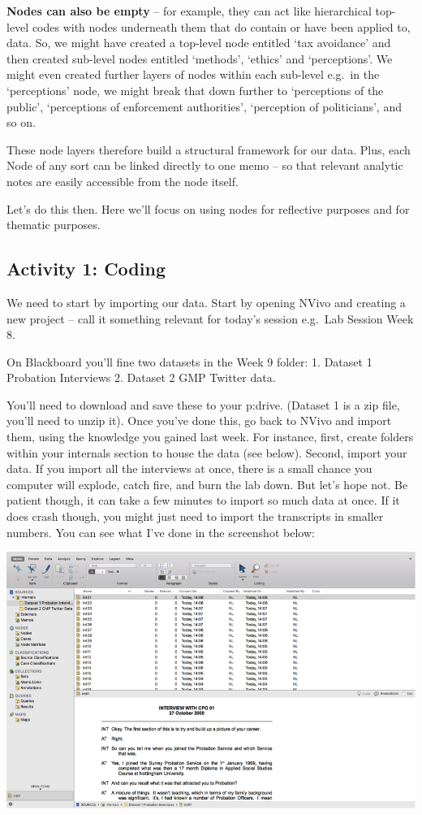 \documentclass[]{book}
\theoremstyle{definition}
\theoremstyle{definition}
\theoremstyle{definition}
\theoremstyle{remark}
\begin{document}
\textbf{Nodes can also be empty} -- for example, they can act like
hierarchical top-level codes with nodes underneath them that do contain
or have been applied to, data. So, we might have created a top-level
node entitled `tax avoidance' and then created sub-level nodes entitled
`methods', `ethics' and `perceptions'. We might even created further
layers of nodes within each sub-level e.g.~in the `perceptions' node, we
might break that down further to `perceptions of the public',
`perceptions of enforcement authorities', `perception of politicians',
and so on.

These node layers therefore build a structural framework for our data.
Plus, each Node of any sort can be linked directly to one memo -- so
that relevant analytic notes are easily accessible from the node itself.

Let's do this then. Here we'll focus on using nodes for reflective
purposes and for thematic purposes.

\hypertarget{activity-1-coding}{%
\subsection{Activity 1: Coding}\label{activity-1-coding}}

We need to start by importing our data. Start by opening NVivo and
creating a new project -- call it something relevant for today's session
e.g.~Lab Session Week 8.

On Blackboard you'll fine two datasets in the Week 9 folder: 1. Dataset
1 Probation Interviews 2. Dataset 2 GMP Twitter data.

You'll need to download and save these to your p:drive. (Dataset 1 is a
zip file, you'll need to unzip it). Once you've done this, go back to
NVivo and import them, using the knowledge you gained last week. For
instance, first, create folders within your internals section to house
the data (see below). Second, import your data. If you import all the
interviews at once, there is a small chance you computer will explode,
catch fire, and burn the lab down. But let's hope not. Be patient
though, it can take a few minutes to import so much data at once. If it
does crash though, you might just need to import the transcripts in
smaller numbers. You can see what I've done in the screenshot below:

\includegraphics{imgs/qual_32.png}
\end{document}
